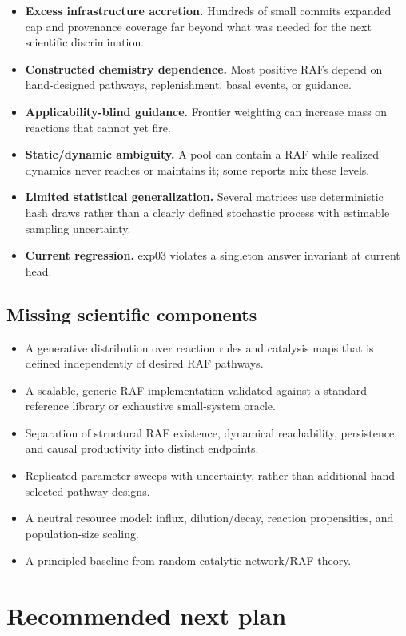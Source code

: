 \documentclass[11pt]{article}
\begin{document}
\begin{itemize}
\item \textbf{Excess infrastructure accretion.}  Hundreds of small commits
  expanded cap and provenance coverage far beyond what was needed for the next
  scientific discrimination.
\item \textbf{Constructed chemistry dependence.}  Most positive RAFs depend on
  hand-designed pathways, replenishment, basal events, or guidance.
\item \textbf{Applicability-blind guidance.}  Frontier weighting can increase
  mass on reactions that cannot yet fire.
\item \textbf{Static/dynamic ambiguity.}  A pool can contain a RAF while
  realized dynamics never reaches or maintains it; some reports mix these
  levels.
\item \textbf{Limited statistical generalization.}  Several matrices use
  deterministic hash draws rather than a clearly defined stochastic process
  with estimable sampling uncertainty.
\item \textbf{Current regression.}  exp03 violates a singleton answer
  invariant at current head.
\end{itemize}

\subsection{Missing scientific components}

\begin{itemize}
\item A generative distribution over reaction rules and catalysis maps that is
  defined independently of desired RAF pathways.
\item A scalable, generic RAF implementation validated against a standard
  reference library or exhaustive small-system oracle.
\item Separation of structural RAF existence, dynamical reachability,
  persistence, and causal productivity into distinct endpoints.
\item Replicated parameter sweeps with uncertainty, rather than additional
  hand-selected pathway designs.
\item A neutral resource model: influx, dilution/decay, reaction propensities,
  and population-size scaling.
\item A principled baseline from random catalytic network/RAF theory.
\end{itemize}

\section{Recommended next plan}
\end{document}
